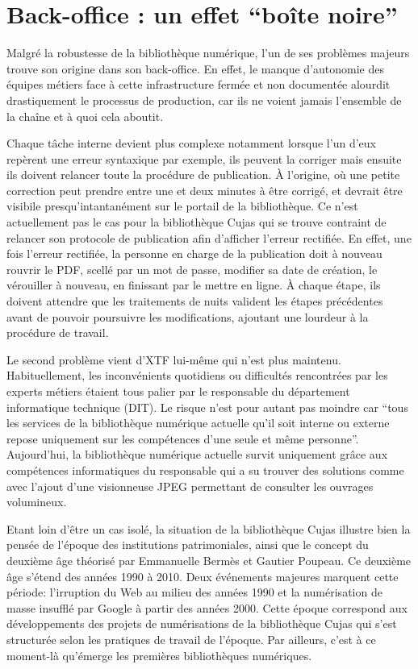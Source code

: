 \section{Back-office : un effet \enquote{boîte noire}}
Malgré la robustesse de la bibliothèque numérique, l'un de ses problèmes majeurs trouve son origine dans son back-office. En effet, le manque d'autonomie des équipes métiers face à cette infrastructure fermée et non documentée alourdit drastiquement le processus de production, car ils ne voient jamais l'ensemble de la chaîne et à quoi cela aboutit. 

Chaque tâche interne devient plus complexe notamment lorsque l'un d'eux repèrent une erreur syntaxique par exemple, ils peuvent la corriger mais ensuite ils doivent relancer toute la procédure de publication. À l'origine, où une petite correction peut prendre entre une et deux minutes à être corrigé, et devrait être visibile presqu'intantanément sur le portail de la bibliothèque. Ce n'est actuellement pas le cas pour la bibliothèque Cujas qui se trouve contraint de relancer son protocole de publication afin d'afficher l'erreur rectifiée. En effet, une fois l'erreur rectifiée, la personne en charge de la publication doit à nouveau rouvrir le PDF, scellé par un mot de passe, modifier sa date de création, le vérouiller à nouveau, en finissant par le mettre en ligne. À chaque étape, ils doivent attendre que les traitements de nuits valident les étapes précédentes avant de pouvoir poursuivre les modifications, ajoutant une lourdeur à la procédure de travail. 

Le second problème vient d'XTF lui-même qui n'est plus maintenu. Habituellement, les inconvénients quotidiens ou difficultés rencontrées par les experts métiers étaient tous palier par le responsable du département informatique technique (DIT). Le risque n'est pour autant pas moindre car \enquote{tous les services de la bibliothèque numérique actuelle qu'il soit interne ou externe repose uniquement sur les compétences d'une seule et même personne}. Aujourd'hui, la bibliothèque numérique actuelle survit uniquement grâce aux compétences informatiques du responsable qui a su trouver des solutions comme avec l'ajout d'une visionneuse JPEG permettant de consulter les ouvrages volumineux. 

Etant loin d'être un cas isolé, la situation de la bibliothèque Cujas illustre bien la pensée de l'époque des institutions patrimoniales, ainsi que le concept du deuxième âge théorisé par Emmanuelle Bermès et Gautier Poupeau. Ce deuxième âge s'étend des années 1990 à 2010. Deux événements majeures marquent cette période: l'irruption du Web au milieu des années 1990 et la numérisation de masse insufflé par Google à partir des années 2000. Cette époque correspond aux développements des projets de numérisations de la bibliothèque Cujas qui s'est structurée selon les pratiques de travail de l'époque. Par ailleurs, c'est à ce moment-là qu'émerge les premières bibliothèques numériques. 

